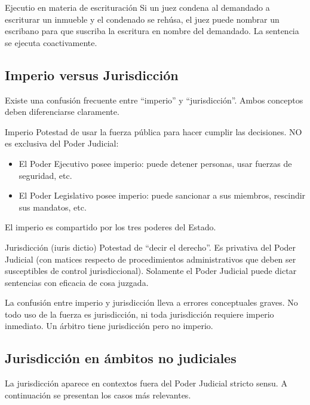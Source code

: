 \documentclass[12pt,oneside]{book}
\begin{document}
\begin{example}{Ejecutio en materia de escrituración}
Si un juez condena al demandado a escriturar un inmueble y el condenado se rehúsa, el juez puede nombrar un escribano para que suscriba la escritura en nombre del demandado. La sentencia se ejecuta coactivamente.
\end{example}

\subsection{Imperio versus Jurisdicción}

Existe una confusión frecuente entre ``imperio'' y ``jurisdicción''. Ambos conceptos deben diferenciarse claramente.

\begin{definition}{Imperio}
Potestad de usar la fuerza pública para hacer cumplir las decisiones. NO es exclusiva del Poder Judicial:
\begin{itemize}
    \item El Poder Ejecutivo posee imperio: puede detener personas, usar fuerzas de seguridad, etc.
    \item El Poder Legislativo posee imperio: puede sancionar a sus miembros, rescindir sus mandatos, etc.
\end{itemize}
El imperio es compartido por los tres poderes del Estado.
\end{definition}

\begin{definition}{Jurisdicción (iuris dictio)}
Potestad de ``decir el derecho''. Es privativa del Poder Judicial (con matices respecto de procedimientos administrativos que deben ser susceptibles de control jurisdiccional). Solamente el Poder Judicial puede dictar sentencias con eficacia de cosa juzgada.
\end{definition}

\begin{important}
La confusión entre imperio y jurisdicción lleva a errores conceptuales graves. No todo uso de la fuerza es jurisdicción, ni toda jurisdicción requiere imperio inmediato. Un árbitro tiene jurisdicción pero no imperio.
\end{important}

\subsection{Jurisdicción en ámbitos no judiciales}

La jurisdicción aparece en contextos fuera del Poder Judicial stricto sensu. A continuación se presentan los casos más relevantes.
\end{document}
